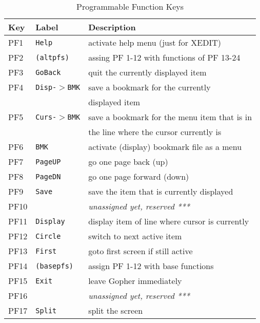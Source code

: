 \begin{table}
\caption{Programmable Function Keys}\label{PF.keys}
\rule{0mm}{2mm} %
\begin{center}
\noindent\begin{tabular}{|l|l|l|}
\hline
Key     & Label             & Description\\
\hline\hline
PF1     & {\tt Help}        & activate help menu (just for XEDIT)           \\
PF2     & {\tt (altpfs)}    & assing PF 1-12 with functions of PF 13-24     \\
PF3     & {\tt GoBack}      & quit the currently displayed item             \\
PF4     & {\tt Disp-$>$BMK} & save a bookmark for the currently             \\
        &                   & displayed item                                \\
\hline
PF5     & {\tt Curs-$>$BMK} & save a bookmark for the menu item that is in  \\
        &                   & the line where the cursor currently is        \\
PF6     & {\tt BMK}         & activate (display) bookmark file as a menu    \\
PF7     & {\tt PageUP}      & go one page back (up)                         \\
PF8     & {\tt PageDN}      & go one page forward (down)                    \\
\hline
PF9     & {\tt Save}        & save the item that is currently displayed     \\
PF10    &                   & {\it unassigned yet, reserved ***}            \\
PF11    & {\tt Display}     & display item of line where cursor is currently\\
PF12    & {\tt Circle}      & switch to next active item                    \\
\hline\hline
PF13    & {\tt First}       & goto first screen if still active             \\
PF14    & {\tt (basepfs)}   & assign PF 1-12 with base functions            \\
PF15    & {\tt Exit}        & leave Gopher immediately                      \\
PF16    &                   & {\it unassigned yet, reserved ***}            \\
\hline
PF17    & {\tt Split}       & split the screen                              \\

\end{tabular}
\end{center}
\end{table}
